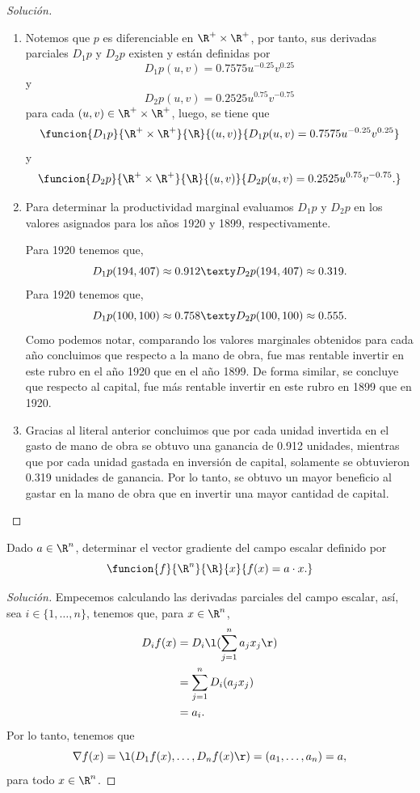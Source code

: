 \documentclass[a4,11pt]{aleph-notas}
\begin{document}
\begin{proof}[Solución]
\begin{enumerate}
        \item 
        Notemos que $p$ es diferenciable en $\R^{+} \times \R^{+}$, por tanto, sus derivadas parciales $D_1 p$ y $D_2 p$ existen y están definidas por
        \[
            D_1 p(u,v) = 0.7575 u^{-0.25} v^{0.25}
        \]
        y
        \[
            D_2 p(u,v) = 0.2525 u^{0.75} v^{-0.75}
        \]
        para cada $(u,v)\in \R^{+} \times \R^{+}$, luego, se tiene que 
        \[
            \funcion{D_1 p}{\R^{+}\times\R^{+}}{\R}{(u,v)}{D_1 p(u,v) = 0.7575 u^{-0.25} v^{0.25}}
        \]
        y
        \[
            \funcion{D_2 p}{\R^{+}\times\R^{+}}{\R}{(u,v)}{D_2 p(u,v) = 0.2525 u^{0.75} v^{-0.75}.}
        \]
        \item
        Para determinar la productividad marginal evaluamos $D_1 p$ y $D_2 p$ en los valores asignados para los años 1920 y 1899, respectivamente.
        
        Para 1920 tenemos que,
        \[
            D_1 p (194, 407) \approx 0.912 \texty D_2 p (194, 407) \approx 0.319.
        \]
        Para 1920 tenemos que,
        \[
            D_1 p (100, 100) \approx 0.758 \texty D_2 p (100, 100) \approx 0.555.
        \]
        Como podemos notar, comparando los valores marginales obtenidos para cada año concluimos que respecto a la mano de obra, fue mas rentable invertir en este rubro en el año 1920 que en el año 1899. De forma similar, se concluye que respecto al capital, fue más rentable invertir en este rubro en 1899 que en 1920. 
        \item 
        Gracias al literal anterior concluimos que por cada unidad invertida en el gasto de mano de obra se obtuvo una ganancia de 0.912 unidades, mientras que por cada unidad gastada en inversión de capital, solamente se obtuvieron 0.319 unidades de ganancia. Por lo tanto, se obtuvo un mayor beneficio al gastar en la mano de obra que en invertir una mayor cantidad de capital.
    \end{enumerate}
\end{proof}

\begin{ejer}
Dado $a\in\R^n$, determinar el vector gradiente del campo escalar definido por
    \[
        \funcion{f}{\R^n}{\R}{x}{f(x)=a\cdot x.}
    \]
\end{ejer}

\begin{proof}[Solución]
Empecemos calculando las derivadas parciales del campo escalar, así, sea $i\in\{1,\ldots,n\}$, tenemos que, para $x\in\R^n$,
    \begin{align*}
        D_if(x) 
            & = D_i \l( \sum_{j=1}^n a_jx_j \r)\\
            & = \sum_{j=1}^n D_i (a_jx_j)\\
            & = a_i.
    \end{align*}
    Por lo tanto, tenemos que
    \[
        \nabla f(x)
        =\l(D_1f(x), \ldots, D_nf(x)\r)
        =(a_1,\ldots,a_n) = a,
    \]
    para todo $x\in \R^n$.
\end{proof}
\end{document}
